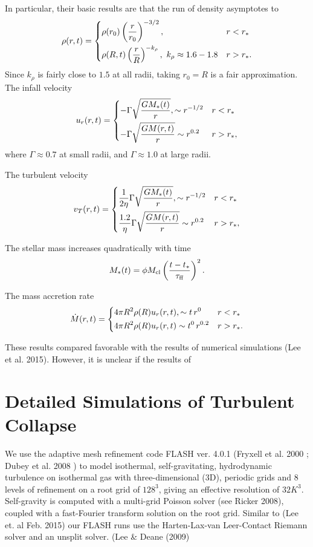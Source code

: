 \documentclass{emulateapj}
\newcommand{\be}{\begin{equation}}
\newcommand{\ee}{\end{equation}}
\newcommand       \etaeff       {\eta}
\newcommand       \tff          {\tau_{\rm ff}}
\begin{document}
In particular, their basic results are that the run of density asymptotes to 
\be
\rho(r,t)=
\begin{dcases}
\rho(r_0)\left({r\over r_0}\right)^{-3/2}, & r<r_*\\
\rho(R,t)\left({r\over R}\right)^{-k_\rho}, \ k_\rho\approx1.6-1.8 & r>r_*.
\end{dcases}
\ee
Since $k_\rho$ is fairly close to $1.5$ at all radii, taking $r_0=R$
is a fair approximation. 
The infall velocity 
%
\be
u_r(r,t)=
\begin{dcases}
-\Gamma\sqrt{GM_*(t)\over r}, \sim r^{-1/2} & r<r_*\\
-\Gamma\sqrt{GM(r,t)\over r} \sim r^{0.2} & r>r_*,
\end{dcases}
\ee
%
where $\Gamma \approx 0.7$ at small radii, and $\Gamma\approx 1.0$ at
large radii. 

The turbulent velocity 
%
\be
v_T(r,t)=
\begin{dcases}
{1\over 2\etaeff}\Gamma\sqrt{GM_*(t)\over r}, \sim r^{-1/2} & r<r_*\\
{1.2\over \etaeff}\Gamma\sqrt{GM(r,t)\over r} \sim r^{0.2} & r>r_*,
\end{dcases}
\ee
%

The stellar mass increases quadratically with time
%
\be  %
M_*(t)=\phi M_{\rm cl}\left({t-t_*\over \tff}\right)^2.
\ee  %
%

The mass accretion rate 
%
\be
\dot M(r,t)=
\begin{dcases}
4\pi R^2\rho(R)u_r(r,t), \sim t\,r^{0} & r<r_*\\
4\pi R^2\rho(R)u_r(r,t) \sim t^0\,r^{0.2} & r>r_*.
\end{dcases}
\ee
%

These results compared favorable with the results of numerical simulations (Lee et al. 2015).  However, it is unclear if the results of 

\section{Detailed Simulations of Turbulent Collapse} \label{sec:simulation setup}

We use the adaptive mesh refinement code FLASH ver. 4.0.1 (Fryxell et al. 
2000
; Dubey
et al.
2008
) to model isothermal, self-gravitating, hydrodynamic turbulence on isothermal gas with three-dimensional (3D),
periodic grids and 8 levels of refinement on a root grid of $128^3$, giving an effective resolution of $32K^3$.  
Self-gravity is computed with a multi-grid Poisson solver (see Ricker 2008), coupled with a fast-Fourier transform solution on the root grid. Similar to (Lee et. al Feb. 2015) our FLASH runs use the Harten-Lax-van Leer-Contact Riemann solver and an unsplit solver. (Lee \& Deane (2009)
\end{document}
